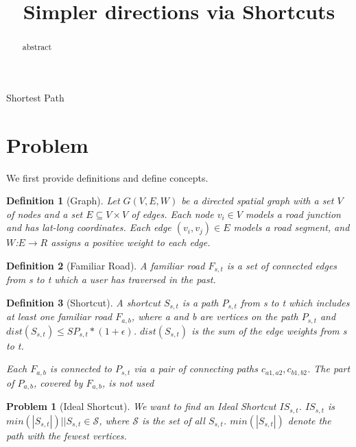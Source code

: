 \documentclass{article}
\newtheorem{definition}{Definition}
\newtheorem{problem}{Problem}
\begin{document}
\pagestyle{plain}
 \title{Simpler directions via Shortcuts}

\maketitle

\begin{abstract}
abstract
\end{abstract}


 {Shortest Path}


\section{Problem}

We first provide definitions and define concepts.%

\begin{definition}[Graph] \label{def:graph}
Let $G(V, E, W)$ be a directed spatial graph with a set $V$ of nodes and a
set $E \subseteq V \times V$ of edges.
Each node $v_i \in V$ models a road junction and has lat-long coordinates.
Each edge $(v_i, v_j) \in E$ models a road segment, and $W$:$E \rightarrow R$
assigns a positive weight to each edge.
\end{definition}


\begin{definition}[Familiar Road] \label{def:froad}
A familiar road $F_{s,t}$ is a set of connected edges from s to t
which a user has traversed in the past.
\end{definition}


\begin{definition}[Shortcut] \label{def:shortcut}
%
A shortcut $S_{s,t}$ is a path $P_{s,t}$ from s to t which includes
at least one familiar road $F_{a,b}$, where a and b are vertices on
the path $P_{s,t}$ and $dist(S_{s,t}) \leq SP_{s,t} \ast (1+\epsilon)$.
$dist(S_{s,t})$ is the sum of the edge weights from s to t.

Each $F_{a,b}$ is connected to $P_{s,t}$ via a pair of connecting paths $c_{a1,a2}, c_{b1,b2}$.
The part of $P_{a,b}$, covered by $F_{a,b}$, is not used
\end{definition}

\begin{problem}[Ideal Shortcut] \label{def:idealshortcut}
We want to find an \textit{Ideal Shortcut} $IS_{s,t}$. 
$IS_{s,t}$ is $min(|S_{s,t}|) || S_{s,t} \in \mathcal{S}$, where $\mathcal{S}$ 
is the set of all $S_{s,t}$. $min(|S_{s,t}|)$ denote the path with the fewest 
vertices.
\end{problem}
\end{document}
